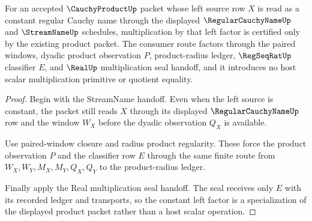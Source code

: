 \begin{theorem}
\label{thm:cauchy-product-constant-left-factor}
For an accepted $\CauchyProductUp$ packet whose left source row $X$ is read as a constant regular Cauchy name through the displayed $\RegularCauchyNameUp$ and $\StreamNameUp$ schedules, multiplication by that left factor is certified only by the existing product packet. The consumer route factors through the paired windows, dyadic product observation $P$, product-radius ledger, $\RegSeqRatUp$ classifier $E$, and $\RealUp$ multiplication seal handoff, and it introduces no host scalar multiplication primitive or quotient equality.
\end{theorem}
\begin{proof}
Begin with the StreamName handoff. Even when the left source is constant, the packet still reads $X$ through its displayed $\RegularCauchyNameUp$ row and the window $W_X$ before the dyadic observation $Q_X$ is available.

Use paired-window closure and radius product regularity. These force the product observation $P$ and the classifier row $E$ through the same finite route from $W_X,W_Y,M_X,M_Y,Q_X,Q_Y$ to the product-radius ledger.

Finally apply the Real multiplication seal handoff. The seal receives only $E$ with its recorded ledger and transports, so the constant left factor is a specialization of the displayed product packet rather than a host scalar operation.
\end{proof}

